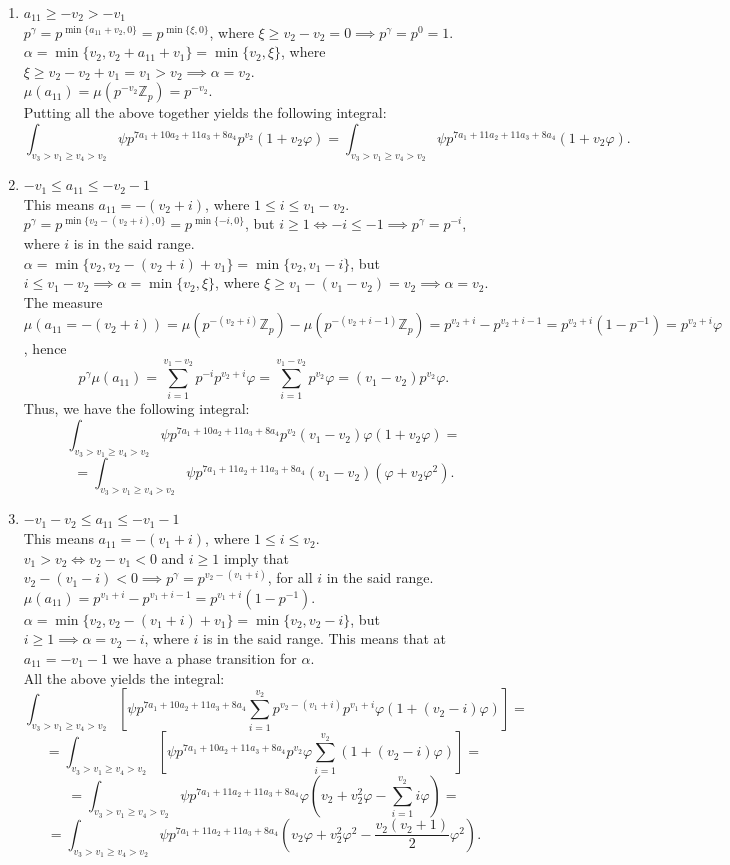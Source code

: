 \documentclass{article}
\begin{document}
\begin{enumerate}
    \item $a_{11}\geq-v_2>-v_1$\\
    $p^{\gamma}=p^{\min\{a_{11}+v_2,0\}}=p^{\min\{\xi,0\}}$, where $\xi\geq{v_2-v_2=0}\implies{p^{\gamma}}=p^0=1$.\\
    $\alpha=\min\{v_2,v_2+a_{11}+v_1\}=\min\{v_2,\xi\}$, where $\xi\geq{v_2-v_2+v_1=v_1}>v_2\implies\alpha=v_2$.\\
    $\mu(a_{11})=\mu(p^{-v_2}\mathbb{Z}_p)=p^{-v_2}$.\\
    Putting all the above together yields the following integral:
\[\int_{v_3>v_1\geq{v_4}>v_2}\psi{p}^{7a_1+10a_2+11a_3+8a_4}p^{v_2}(1+v_2\varphi)=\int_{v_3>v_1\geq{v_4}>v_2}\psi{p}^{7a_1+11a_2+11a_3+8a_4}(1+v_2\varphi).\]
\item $-v_1\leq{a_{11}}\leq-v_2-1$\\
This means $a_{11}=-(v_2+i)$, where $1\leq{i}\leq{v_1}-v_2$.\\
$p^{\gamma}=p^{\min\{v_2-(v_2+i),0\}}=p^{\min\{-i,0\}}$, but $i\geq{1}\iff-i\leq-1\implies{p^{\gamma}}=p^{-i}$, where $i$ is in the said range.\\
$\alpha=\min\{v_2,v_2-(v_2+i)+v_1\}=\min\{v_2,v_1-i\}$, but $i\leq{v_1-v_2}\implies\alpha=\min\{v_2,\xi\}$, where $\xi\geq{v_1}-(v_1-v_2)=v_2\implies\alpha=v_2$.\\
The measure $\mu(a_{11}=-(v_2+i))=\mu(p^{-(v_2+i)}\mathbb{Z}_p)-\mu(p^{-(v_2+i-1)}\mathbb{Z}_p)=p^{v_2+i}-p^{v_2+i-1}=p^{v_2+i}(1-p^{-1})=p^{v_2+i}\varphi$, hence
\[p^{\gamma}\mu(a_{11})=\sum_{i=1}^{v_1-v_2}p^{-i}p^{v_2+i}\varphi=\sum_{i=1}^{v_1-v_2}p^{v_2}\varphi=(v_1-v_2)p^{v_2}\varphi.\]
Thus, we have the following integral:
\[\int_{v_3>v_1\geq{v_4}>v_2}\psi{p}^{7a_1+10a_2+11a_3+8a_4}p^{v_2}(v_1-v_2)\varphi(1+v_2\varphi)=\]\[=\int_{v_3>v_1\geq{v_4}>v_2}\psi{p}^{7a_1+11a_2+11a_3+8a_4}(v_1-v_2)(\varphi+v_2\varphi^2).\]
\item $-v_1-v_2\leq{a_{11}}\leq{-v_1-1}$\\
This means $a_{11}=-(v_1+i)$, where $1\leq{i}\leq{v_2}$.\\
$v_1>v_2\iff{v_2-v_1<0}$ and $i\geq{1}$ imply that $v_2-(v_1-i)<0\implies{p^{\gamma}}=p^{v_2-(v_1+i)}$, for all $i$ in the said range.\\
$\mu(a_{11})=p^{v_1+i}-p^{v_1+i-1}=p^{v_1+i}(1-p^{-1})$.
$\alpha=\min\{v_2,v_2-(v_1+i)+v_1\}=\min\{v_2,v_2-i\}$, but $i\geq{1}\implies\alpha=v_2-i$, where $i$ is in the said range. This means that at $a_{11}=-v_1-1$ we have a phase transition for $\alpha$.\\
All the above yields the integral:
\[\int_{v_3>v_1\geq{v_4}>v_2}\left[\psi{p}^{7a_1+10a_2+11a_3+8a_4}\sum_{i=1}^{v_2}p^{v_2-(v_1+i)}p^{v_1+i}\varphi(1+(v_2-i)\varphi)\right]=\]\[=\int_{v_3>v_1\geq{v_4}>v_2}\left[\psi{p}^{7a_1+10a_2+11a_3+8a_4}p^{v_2}\varphi\sum_{i=1}^{v_2}(1+(v_2-i)\varphi)\right]=\]\[=\int_{v_3>v_1\geq{v_4}>v_2}\psi{p}^{7a_1+11a_2+11a_3+8a_4}\varphi(v_2+v_2^2\varphi-\sum_{i=1}^{v_2}i\varphi)=\]\[=\int_{v_3>v_1\geq{v_4}>v_2}\psi{p}^{7a_1+11a_2+11a_3+8a_4}(v_2\varphi+v_2^2\varphi^2-\frac{v_2(v_2+1)}{2}\varphi^2).\]
\end{enumerate}
\end{document}

